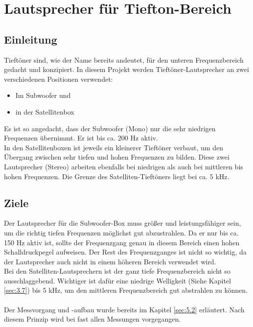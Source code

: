 \section{Lautsprecher für Tiefton-Bereich} \label{sec:5.3}
\subsection*{Einleitung} \label{subsec:5.3.1}
Tieftöner sind, wie der Name bereits andeutet, für den unteren Frequenzbereich gedacht und konzipiert.
In diesem Projekt werden Tieftöner-Lautsprecher an zwei verschiedenen Positionen verwendet:
\begin{itemize}
	\item Im Subwoofer und 
	\item in der Satellitenbox
\end{itemize}
Es ist so angedacht, dass der Subwoofer (Mono) nur die sehr niedrigen Frequenzen übernimmt.
Er ist bis ca. 200 Hz aktiv.\\
In den Satellitenboxen ist jeweils ein kleinerer Tieftöner verbaut, um den Übergang zwischen sehr tiefen und hohen Frequenzen zu bilden.
Diese zwei Lautsprecher (Stereo) arbeiten ebenfalls bei niedrigen als auch bei mittleren bis hohen Frequenzen.
Die Grenze des Satelliten-Tieftöners liegt bei ca. 5 kHz.

\subsection*{Ziele} \label{subsec:5.3.2}
Der Lautsprecher für die Subwoofer-Box muss größer und leistungsfähiger sein, um die richtig tiefen Frequenzen möglichst gut abzustrahlen.
Da er nur bis ca. 150 Hz aktiv ist, sollte der Frequenzgang genau in diesem Bereich einen hohen Schalldruckpegel aufweisen.
Der Rest des Frequenzganges ist nicht so wichtig, da der Lautsprecher auch nicht in einem höheren Bereich verwendet wird. \\
Bei den Satelliten-Lautsprechern ist der ganz tiefe Frequenzbereich nicht so ausschlaggebend.
Wichtiger ist dafür eine niedrige Welligkeit (Siehe Kapitel \ref{sec:3.7}) bis 5 kHz, um den mittleren Frequenzbereich gut abstrahlen zu können.\\ \\
Der Messvorgang und -aufbau wurde bereits im Kapitel \ref{sec:5.2} erläutert.
Nach diesem Prinzip wird bei fast allen Messungen vorgegangen.

\newpage
